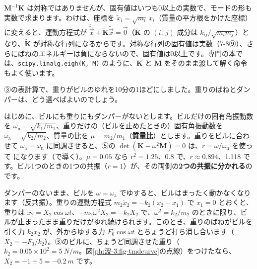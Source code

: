 \begin{seikaku}
$\mathbf M^{-1}\mathbf K$ は対称ではありませんが、固有値はいつも0以上の実数で、モードの形も実数で求まります。わけは、座標を $\tilde x_i=\sqrt{m_i}\,x_i$（質量の平方根をかけた座標）に変えると、運動方程式が $\ddot{\tilde{\vec x}}+\tilde{\mathbf K}\tilde{\vec x}=\vec 0$（$\tilde{\mathbf K}$ の $(i,\ j)$ 成分は $k_{ij}/\sqrt{m_im_j}$）となり、$\tilde{\mathbf K}$ が対称な行列になるからです。対称な行列の固有値は実数（7-8⑨）、さらにばねのエネルギーは負にならないので、固有値は0以上です。専門の本では、\texttt{scipy.linalg.eigh(K, M)} のように、$\mathbf K$ と $\mathbf M$ をそのまま渡して解く命令もよく使います。
\end{seikaku}

\label{ph:波-3:sec6}
③の表計算で、重りがビルのゆれを10分の1ほどにしました。重りのばねとダンパーは、どう選べばよいのでしょう。

はじめに、ビルにも重りにもダンパーがないとします。ビルだけの固有角振動数を $\omega_{\mathrm n}=\sqrt{k_1/m_1}$、重りだけの（ビルを止めたときの）固有角振動数を $\omega_{\mathrm a}=\sqrt{k_2/m_2}$、質量の比を $\mu=m_2/m_1$（\textbf{質量比}）とします。重りをビルに合わせて $\omega_{\mathrm a}=\omega_{\mathrm n}$ に同調させると、⑤の $\det(\mathbf K-\omega^2\mathbf M)=0$ は、$r=\omega/\omega_{\mathrm n}$ を使って
になります（で導く）。$\mu=0.05$ なら $r^2=1.25$、0.8 で、$r\approx0.894$、1.118 です。ビル1つのときの1つの共振（$r=1$）が、その両側の\textbf{2つの共振に分かれる}のです。

ダンパーのないまま、ビルを $\omega=\omega_{\mathrm a}$ でゆすると、ビルはまったく動かなくなります（反共振）。重りの運動方程式 $m_2\ddot x_2=-k_2(x_2-x_1)$ で $x_1=0$ とおくと、重りは $x_2=X_2\cos\omega t$、$-m_2\omega^2X_2=-k_2X_2$ で、$\omega^2=k_2/m_2$ のときに限り、ビルが止まったまま重りだけがゆれ続けられます。このとき、重りのばねがビルを引く力 $k_2x_2$ が、外からゆする力 $F_0\cos\omega t$ とちょうど打ち消し合います（$X_2=-F_0/k_2$）。③のビルに、ちょうど同調させた重り（$k_2=0.05\times10^2=\qty{5}{N/m}$。図\ref{ph:波-3:fig-tmdcurve}の点線）をつけたなら、$X_2=-1\div5=\qty{-0.2}{m}$ です。

